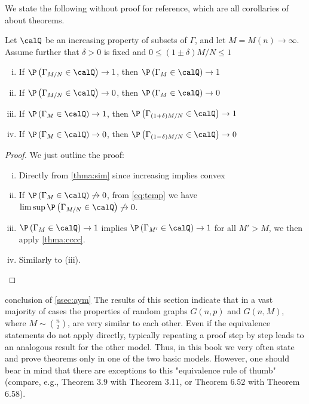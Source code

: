 \documentclass{article}
\begin{document}
We state the following without proof for reference, which are all corollaries of about theorems.
\begin{cora}\label{cora:1or0}
Let $\calQ$ be an increasing property of subsets of $\Gamma$, and let $M=M(n) \rightarrow \infty .$ Assume further that $\delta>0$ is fixed and $0 \leq(1 \pm \delta) M / N \leq 1$
\begin{enumerate}[(i)]
    \item If $\P \left(\Gamma_{M / N} \in \calQ \right) \rightarrow 1$, then $\P \left(\Gamma_{M} \in \calQ \right) \rightarrow 1$
    \item If $\P \left(\Gamma_{M / N} \in \calQ \right) \rightarrow 0$, then $\P \left(\Gamma_{M} \in \calQ \right) \rightarrow 0$
    \item If $\P \left(\Gamma_{M} \in \calQ \right) \rightarrow 1$, then $\P \left(\Gamma_{(1+\delta) M / N} \in \calQ \right) \rightarrow 1$
    \item If $\P \left(\Gamma_{M} \in \calQ \right) \rightarrow 0$, then $\P \left(\Gamma_{(1-\delta) M / N} \in \calQ \right) \rightarrow 0$
\end{enumerate}
\end{cora}
\begin{proof}We just outline the proof:
\begin{enumerate}[(i)]
    \item Directly from \cref{thma:sim} since increasing implies convex
    \item If $\P \left(\Gamma_{M} \in \calQ \right)\not\to 0$, from \cref{eq:temp} we have $\limsup\P \left(\Gamma_{M / N} \in \calQ \right) \not\to 0$.
    \item $\P \left(\Gamma_{M} \in \calQ \right) \rightarrow 1$ implies  $\P \left(\Gamma_{M'} \in \calQ \right) \rightarrow 1$ for all $M'>M$, we then apply \cref{thma:cccc}. 
    \item Similarly to (iii).
\end{enumerate}
\end{proof}

\begin{rema}{conclusion of \cref{ssec:aym}}
The results of this section indicate that in a vast majority of cases the properties of random graphs $G(n, p)$ and $G (n, M)$, where $M \sim\binom{n}{2}$, are very similar to each other. Even if the equivalence statements do not apply directly, typically repeating a proof step by step leads to an analogous result for the other model. Thus, in this book we very often state and prove theorems only in one of the two basic models. However, one should bear in mind that there are exceptions to this "equivalence rule of thumb" (compare,
e.g., Theorem $3.9$ with Theorem 3.11, or Theorem $6.52$ with Theorem 6.58).
\end{rema} 
\end{document}
